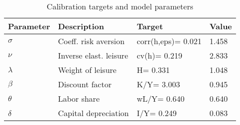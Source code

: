 \begin{table}[!htbp]
\centering
\caption{Calibration targets and model parameters}
\begin{tabular}{llll}
\toprule
Parameter & Description & Target & Value \\
\midrule
$\sigma$  & Coeff. risk aversion   & corr(h,eps)= 0.021 & 1.458 \\
$\nu$     & Inverse elast. leisure & cv(h)= 0.219       & 2.833 \\
$\lambda$ & Weight of leisure      & H= 0.331           & 1.048 \\
$\beta$   & Discount factor        & K/Y= 3.003         & 0.945 \\
$\theta$  & Labor share            & wL/Y= 0.640        & 0.640 \\
$\delta$  & Capital depreciation   & I/Y= 0.249         & 0.083 \\
\bottomrule
\end{tabular}
\end{table}
